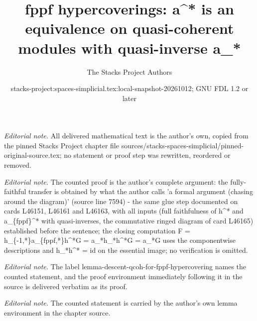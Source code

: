 \documentclass{stacks-project}
\title{fppf hypercoverings: a\textasciicircum{}* is an equivalence on quasi-coherent modules with quasi-inverse a\_*}
\author{The Stacks Project Authors}
\date{stacks-project:spaces-simplicial.tex:local-snapshot-20261012; GNU FDL 1.2 or later}
\theoremstyle{plain}
\theoremstyle{definition}
\theoremstyle{remark}
\numberwithin{equation}{subsection}
\begin{document}
\maketitle
\noindent\textit{Editorial note.} All delivered mathematical text is the author's own, copied from the pinned Stacks Project chapter file sources/stacks-spaces-simplicial/pinned-original-source.tex; no statement or proof step was rewritten, reordered or removed.\par\medskip
\noindent\textit{Editorial note.} The counted proof is the author's complete argument: the fully-faithful transfer is obtained by what the author calls 'a formal argument (chasing around the diagram)' (source line 7594) - the same glue step documented on cards L46151, L46161 and L46163, with all inputs (full faithfulness of h\textasciicircum{}* and a\_\{fppf\}\textasciicircum{}* with quasi-inverses, the commutative ringed diagram of card L46165) established before the sentence; the closing computation F = h\_\{-1,*\}a\_\{fppf,*\}h\textasciicircum{}*G = a\_*h\_*h\textasciicircum{}*G = a\_*G uses the componentwise descriptions and h\_*h\textasciicircum{}* = id on the essential image; no verification is omitted.\par\medskip
\noindent\textit{Editorial note.} The label lemma-descent-qcoh-for-fppf-hypercovering names the counted statement, and the proof environment immediately following it in the source is delivered verbatim as its proof.\par\medskip
\noindent\textit{Editorial note.} The counted statement is carried by the author's own lemma environment in the chapter source.\par\medskip
\end{document}

